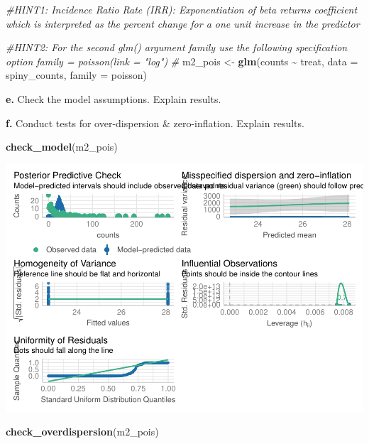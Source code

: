 \documentclass[
]{article}
\newenvironment{Shaded}{\begin{snugshade}}{\end{snugshade}}
\newcommand{\AttributeTok}[1]{\textcolor[rgb]{0.13,0.29,0.53}{#1}}
\newcommand{\CommentTok}[1]{\textcolor[rgb]{0.56,0.35,0.01}{\textit{#1}}}
\newcommand{\FunctionTok}[1]{\textcolor[rgb]{0.13,0.29,0.53}{\textbf{#1}}}
\newcommand{\NormalTok}[1]{#1}
\newcommand{\OtherTok}[1]{\textcolor[rgb]{0.56,0.35,0.01}{#1}}
\newcommand{\SpecialCharTok}[1]{\textcolor[rgb]{0.81,0.36,0.00}{\textbf{#1}}}
\begin{document}
\begin{Shaded}
\begin{Highlighting}[]
\CommentTok{\#HINT1: Incidence Ratio Rate (IRR): Exponentiation of beta returns coefficient which is interpreted as the \textquotesingle{}percent change\textquotesingle{} for a one unit increase in the predictor }

\CommentTok{\#HINT2: For the second glm() argument \textasciigrave{}family\textasciigrave{} use the following specification option \textasciigrave{}family = poisson(link = "log")\textasciigrave{}}
\CommentTok{\#}
\NormalTok{m2\_pois }\OtherTok{\textless{}{-}} \FunctionTok{glm}\NormalTok{(counts }\SpecialCharTok{\textasciitilde{}}\NormalTok{ treat, }
                   \AttributeTok{data =}\NormalTok{ spiny\_counts,}
                   \AttributeTok{family =}\NormalTok{ poisson) }
\end{Highlighting}
\end{Shaded}

\textbf{e.} Check the model assumptions. Explain results.

\textbf{f.} Conduct tests for over-dispersion \& zero-inflation. Explain
results.

\begin{Shaded}
\begin{Highlighting}[]
\FunctionTok{check\_model}\NormalTok{(m2\_pois)}
\end{Highlighting}
\end{Shaded}

\includegraphics{hw1-lobstrs-eds241_files/figure-latex/unnamed-chunk-20-1.pdf}

\begin{Shaded}
\begin{Highlighting}[]
\FunctionTok{check\_overdispersion}\NormalTok{(m2\_pois)}
\end{Highlighting}
\end{Shaded}
\end{document}
